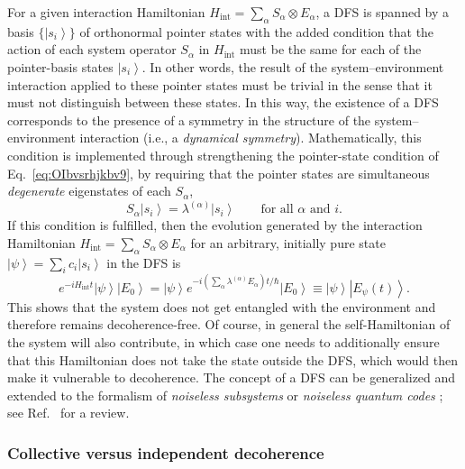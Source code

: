 \documentclass[3p,sort&compress,12pt]{elsarticle}
\newcommand{\ket}[1]{\left\vert{#1}\right\rangle}
\newcommand{\E}{\ensuremath{e}}
\newcommand{\I}{\ensuremath{i}}
\newcommand{\op}[1]{#1}
\begin{document}
For a given interaction Hamiltonian $\op{H}_\text{int} =  \sum_\alpha \op{S}_\alpha \otimes \op{E}_\alpha$, a DFS is spanned by a basis $\{\ket{s_i}\}$ of orthonormal pointer states with the added condition that the action of each system operator $\op{S}_\alpha$ in $\op{H}_\text{int}$ must be the same for each of the pointer-basis states $\ket{s_i}$. In other words, the result of the system--environment interaction applied to these pointer states must be trivial in the sense that it must not distinguish between these states. In this way, the existence of a DFS corresponds to the presence of a symmetry in the structure of the system--environment interaction (i.e., a \emph{dynamical symmetry}). Mathematically, this condition is implemented through strengthening the pointer-state condition of Eq.~\eqref{eq:OIbvsrhjkbv9}, by requiring that the pointer states are simultaneous \emph{degenerate} eigenstates of each $\op{S}_\alpha$,
%
\begin{equation}
  \label{eq:OIbvsrhjkbvsfljvh9}
  \op{S}_\alpha \ket{s_i} = \lambda^{(\alpha)} \ket{s_i} \qquad
  \text{for all $\alpha$ and $i$}. 
\end{equation}
%
If this condition is fulfilled, then the evolution generated by the interaction Hamiltonian $\op{H}_\text{int} =  \sum_\alpha \op{S}_\alpha \otimes \op{E}_\alpha$ for an arbitrary, initially pure state $\ket{\psi} = \sum_i c_i \ket{s_i}$ in the DFS is 
%
\begin{equation}
  \label{eq:OIbvsrhjkbv9zFFHGSVCxc}
  \E^{-\I \op{H}_\text{int}t} \ket{\psi}\ket{E_0} = \ket{\psi}\E^{-\I
    \left( \sum_\alpha \lambda^{(\alpha)} E_\alpha \right)t/\hbar}
  \ket{E_0} \equiv \ket{\psi} \ket{E_\psi(t)}.
\end{equation}
%
This shows that the system does not get entangled with the environment and therefore remains decoherence-free. Of course, in general the self-Hamiltonian of the system will also contribute, in which case one needs to additionally ensure that this Hamiltonian does not take the state outside the DFS, which would then make it vulnerable to decoherence. The concept of a DFS can be generalized and extended to the formalism of \emph{noiseless subsystems} or \emph{noiseless quantum codes} \cite{Knill:2000:aa,Kempe:2001:oo,Lidar:2003:aa,Choi:2006:tt,Beny:2007:pp,BlumeKohout:2010:pp, Lidar:2014:pp}; see Ref.~\cite{Lidar:2014:pp} for a review.

\subsubsection{Collective versus independent decoherence}
\end{document}
